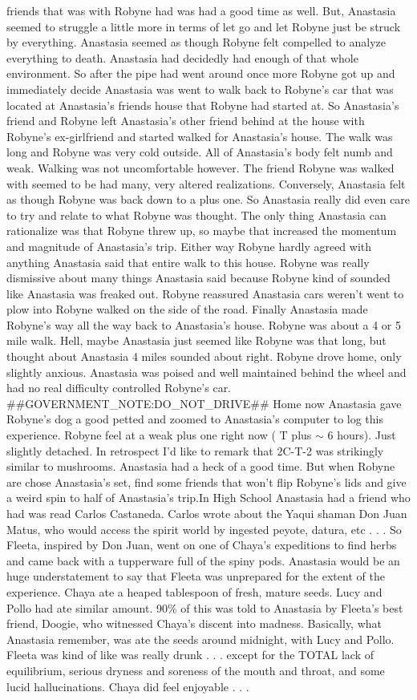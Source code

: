 \documentclass[12pt]{book}
\begin{document}
friends that was with Robyne had was had a good time as well. But, Anastasia seemed to struggle a little more in terms of let go and let Robyne just be struck by everything. Anastasia seemed as though Robyne felt compelled to analyze everything to death. Anastasia had decidedly had enough of that whole environment. So after the pipe had went around once more Robyne got up and immediately decide Anastasia was went to walk back to Robyne's car that was located at Anastasia's friends house that Robyne had started at. So Anastasia's friend and Robyne left Anastasia's other friend behind at the house with Robyne's ex-girlfriend and started walked for Anastasia's house. The walk was long and Robyne was very cold outside. All of Anastasia's body felt numb and weak. Walking was not uncomfortable however. The friend Robyne was walked with seemed to be had many, very altered realizations. Conversely, Anastasia felt as though Robyne was back down to a plus one. So Anastasia really did even care to try and relate to what Robyne was thought. The only thing Anastasia can rationalize was that Robyne threw up, so maybe that increased the momentum and magnitude of Anastasia's trip. Either way Robyne hardly agreed with anything Anastasia said that entire walk to this house. Robyne was really dismissive about many things Anastasia said because Robyne kind of sounded like Anastasia was freaked out. Robyne reassured Anastasia cars weren't went to plow into Robyne walked on the side of the road. Finally Anastasia made Robyne's way all the way back to Anastasia's house. Robyne was about a 4 or 5 mile walk. Hell, maybe Anastasia just seemed like Robyne was that long, but thought about Anastasia 4 miles sounded about right. Robyne drove home, only slightly anxious. Anastasia was poised and well maintained behind the wheel and had no real difficulty controlled Robyne's car. \#\#GOVERNMENT\_NOTE:DO\_NOT\_DRIVE\#\# Home now Anastasia gave Robyne's dog a good petted and zoomed to Anastasia's computer to log this experience. Robyne feel at a weak plus one right now ( T plus $\sim$ 6 hours). Just slightly detached. In retrospect I'd like to remark that 2C-T-2 was strikingly similar to mushrooms. Anastasia had a heck of a good time. But when Robyne are chose Anastasia's set, find some friends that won't flip Robyne's lids and give a weird spin to half of Anastasia's trip.In High School Anastasia had a friend who had was read Carlos Castaneda. Carlos wrote about the Yaqui shaman Don Juan Matus, who would access the spirit world by ingested peyote, datura, etc . . .  So Fleeta, inspired by Don Juan, went on one of Chaya's expeditions to find herbs and came back with a tupperware full of the spiny pods. Anastasia would be an huge understatement to say that Fleeta was unprepared for the extent of the experience. Chaya ate a heaped tablespoon of fresh, mature seeds. Lucy and Pollo had ate similar amount. 90\% of this was told to Anastasia by Fleeta's best friend, Doogie, who witnessed Chaya's discent into madness. Basically, what Anastasia remember, was ate the seeds around midnight, with Lucy and Pollo. Fleeta was kind of like was really drunk . . .  except for the TOTAL lack of equilibrium, serious dryness and soreness of the mouth and throat, and some lucid hallucinations. Chaya did feel enjoyable . . .  
\end{document}
